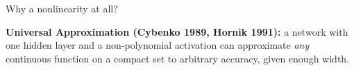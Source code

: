 \documentclass[9pt]{beamer}
\begin{document}
\begin{frame}{Why a nonlinearity at all?}
  
  \textbf{Universal Approximation (Cybenko 1989, Hornik 1991):} a network with one
  hidden layer and a non-polynomial activation can approximate \emph{any} continuous
  function on a compact set to arbitrary accuracy, given enough width.

  \vfill


\end{frame}
\end{document}
